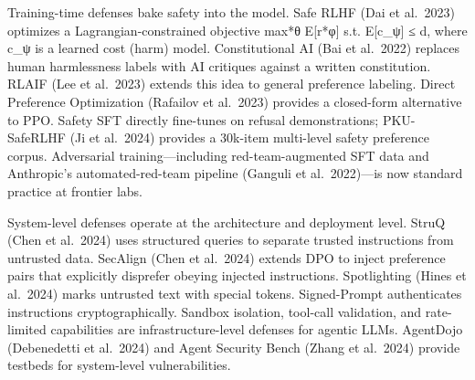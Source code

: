 \documentclass{article}
\begin{document}
Training-time defenses bake safety into the model. Safe RLHF (Dai et al.~2023) optimizes a Lagrangian-constrained objective max*θ E{[}r*φ{]} s.t. E{[}c\_ψ{]} ≤ d, where c\_ψ is a learned cost (harm) model. Constitutional AI (Bai et al.~2022) replaces human harmlessness labels with AI critiques against a written constitution. RLAIF (Lee et al.~2023) extends this idea to general preference labeling. Direct Preference Optimization (Rafailov et al.~2023) provides a closed-form alternative to PPO. Safety SFT directly fine-tunes on refusal demonstrations; PKU-SafeRLHF (Ji et al.~2024) provides a 30k-item multi-level safety preference corpus. Adversarial training---including red-team-augmented SFT data and Anthropic's automated-red-team pipeline (Ganguli et al.~2022)---is now standard practice at frontier labs.

System-level defenses operate at the architecture and deployment level. StruQ (Chen et al.~2024) uses structured queries to separate trusted instructions from untrusted data. SecAlign (Chen et al.~2024) extends DPO to inject preference pairs that explicitly disprefer obeying injected instructions. Spotlighting (Hines et al.~2024) marks untrusted text with special tokens. Signed-Prompt \citep{suo2024arxiv2401076122024} authenticates instructions cryptographically. Sandbox isolation, tool-call validation, and rate-limited capabilities are infrastructure-level defenses for agentic LLMs. AgentDojo (Debenedetti et al.~2024) and Agent Security Bench (Zhang et al.~2024) provide testbeds for system-level vulnerabilities.
\end{document}

